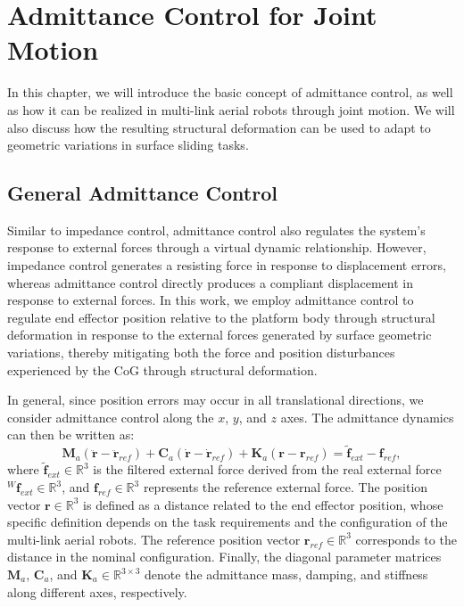 \chapter{Admittance Control for Joint Motion}
\label{ch:admittance}
In this chapter, we will introduce the basic concept of admittance control, as well as how it can be realized in multi-link aerial robots through joint motion. We will also discuss how the resulting structural deformation can be used to adapt to geometric variations in surface sliding tasks.

\section{General Admittance Control}

Similar to impedance control, admittance control also regulates the system's response to external forces through a virtual dynamic relationship. However, impedance control generates a resisting force in response to displacement errors, whereas admittance control directly produces a compliant displacement in response to external forces. In this work, we employ admittance control to regulate end effector position relative to the platform body through structural deformation in response to the external forces generated by surface geometric variations, thereby mitigating both the force and position disturbances experienced by the CoG through structural deformation.

In general, since position errors may occur in all translational directions, we consider admittance control along the $x$, $y$, and $z$ axes. The admittance dynamics can then be written as:
\begin{equation}
\label{eq:admittance control}
    \boldsymbol{M}_a(\boldsymbol{\ddot{r}}-\boldsymbol{\ddot{r}}_{ref})+\boldsymbol{C}_a(\boldsymbol{\dot{r}}-\boldsymbol{\dot{r}}_{ref})+\boldsymbol{K}_a(\boldsymbol{r}-\boldsymbol{r}_{ref})={\boldsymbol{\tilde{f}}_{ext}}-\boldsymbol{f}_{ref},
\end{equation}
where ${\boldsymbol{\tilde{f}}_{ext}} \in \mathbb{R}^{3}$ is the filtered external force derived from the real external force ${^W\!\boldsymbol{f}_{ext}} \in \mathbb{R}^{3}$, and $\boldsymbol{f}_{ref} \in \mathbb{R}^{3}$ represents the reference external force. The position vector $\boldsymbol{r} \in \mathbb{R}^{3}$ is defined as a distance related to the end effector position, whose specific definition depends on the task requirements and the configuration of the multi-link aerial robots. The reference position vector $\boldsymbol{r}_{ref} \in \mathbb{R}^{3}$ corresponds to the distance in the nominal configuration. Finally, the diagonal parameter matrices $\boldsymbol{M}_a$, $\boldsymbol{C}_a$, and $\boldsymbol{K}_a \in \mathbb{R}^{3\times3}$ denote the admittance mass, damping, and stiffness along different axes, respectively.


